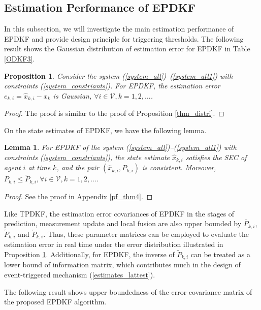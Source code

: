 \documentclass[journal,transmag]{IEEEtran}
\newtheorem{lemma}{\textbf{Lemma}}
\newtheorem{proposition}{\textbf{Proposition}}
\begin{document}
{	\subsection{Estimation Performance of EPDKF}\label{subsec_EPDKF}
	In this subsection, we will investigate the main estimation performance of EPDKF and provide  design principle for triggering thresholds.
	The following result shows the Gaussian distribution of estimation error for EPDKF in Table \ref{ODKF3}.	
	\begin{proposition}\label{thm_distri2}
	{		Consider the system (\ref{system_all})--(\ref{system_all1}) with constraints (\ref{system_constriants}). For EPDKF, the estimation error $e_{k,i}=\hat x_{k,i}-x_{k}$ is Gaussian, $\forall i\in \mathcal{V}, k=1,2,\ldots$.}
	\end{proposition}	
	\begin{proof}
		The proof is similar to the proof of Proposition \ref{thm_distri}.
	\end{proof}	
	On the state estimates of EPDKF, we have the following lemma.	
	\begin{lemma}\label{thm_pro2}
	For EPDKF of the system (\ref{system_all})--(\ref{system_all1}) with constraints (\ref{system_constriants}),
	the state estimate $\hat x_{k,i}$  satisfies the SEC of agent $i$ at time $k$, and 
	 the pair $(\hat x_{k,i}, P_{k,i})$ is consistent.   Moreover, $ P_{k,i}\leq\check P_{k,i}, \forall i\in \mathcal{V}, k=1,2,\ldots$.
	\end{lemma}
	\begin{proof}
		See the proof in Appendix \ref{pf_thm4}.
	\end{proof}
	

	
	
	Like TPDKF, the estimation error covariances of EPDKF in the stages of prediction, measurement update and local fusion are also upper bounded by  $\bar P_{k,i}$, $\tilde P_{k,i}$ and $\check P_{k,i}$.
	Thus, these parameter matrices can be employed to evaluate the estimation error in real time under the error distribution illustrated in Proposition \ref{thm_distri2}.  Additionally, for EPDKF,  the inverse of $\tilde P_{k,i}$  can be treated as a lower bound of information matrix, which contributes much in the design of event-triggered mechanism (\ref{estimates_lattest}). 

	{
	The following result shows  upper boundedness of the error covariance matrix of the proposed EPDKF algorithm.}
	
}
\end{document}
